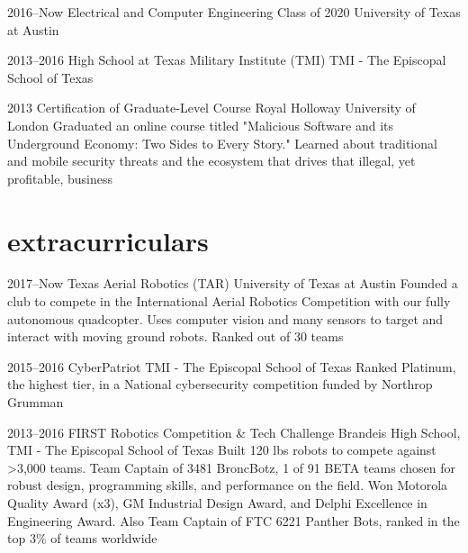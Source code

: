 \documentclass[]{friggeri-cv} %
\begin{document}
\begin{entrylist}

	\vspace{-12pt}
	\entry
	{2016--Now}
	{Electrical and Computer Engineering Class of 2020}
	{University of Texas at Austin}


	\vspace{-12pt}
	\entry
	{2013--2016}
	{High School at Texas Military Institute (TMI)}
	{TMI - The Episcopal School of Texas}


	\vspace{-12pt}
	\entry
	{2013}
	{Certification of Graduate-Level Course}
	{Royal Holloway University of London}
	{Graduated an online course titled "Malicious Software and its Underground Economy: Two Sides to Every Story." Learned about traditional and mobile security threats and the ecosystem that drives that illegal, yet profitable, business}

\end{entrylist}

\vspace{-1pt}

\section{extracurriculars}

\begin{entrylist}

	\entry
	{2017--Now}
	{Texas Aerial Robotics (TAR)}
	{University of Texas at Austin}
	{Founded a club to compete in the International Aerial Robotics Competition with our fully autonomous quadcopter. Uses computer vision and many sensors to target and interact with moving ground robots. Ranked  out of 30 teams}


	\entry
	{2015--2016}
	{CyberPatriot}
	{TMI - The Episcopal School of Texas}
	{Ranked Platinum, the highest tier, in a National cybersecurity competition funded by Northrop Grumman}


	\entry
	{2013--2016}
	{FIRST Robotics Competition \& Tech Challenge}
	{Brandeis High School, TMI - The Episcopal School of Texas}
	{Built 120 lbs robots to compete against >3,000 teams. Team Captain of 3481 BroncBotz, 1 of 91 BETA teams chosen for robust design, programming skills, and performance on the field. Won Motorola Quality Award (x3), GM Industrial Design Award, and Delphi Excellence in Engineering Award. Also Team Captain of FTC 6221 Panther Bots, ranked in the top 3\% of teams worldwide}

\end{entrylist}
\end{document}
